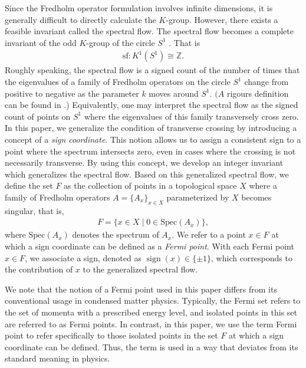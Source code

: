 \documentclass{amsart}
\theoremstyle{definition}
\theoremstyle{remark}
\begin{document}
Since the Fredholm operator formulation involves infinite dimensions, it is generally difficult to directly calculate the $K$-group. However, there exists a feasible invariant called the spectral flow. The spectral flow becomes a complete invariant of the odd $K$-group of the circle $S^1$ \cite{Atiyah76}.
 That is
\begin{align*}
\text{sf}\colon K^1(S^1)\cong \mathbb{Z}.
\end{align*}
Roughly speaking, the spectral flow is a signed count of the number of times that the eigenvalues of a family of Fredholm operators on the circle $S^1$ change from positive to negative as the parameter $k$ moves around $S^1$. $(A$ rigours
 definition can be found in \cite{Phillips}.) Equivalently, one may interpret the spectral flow as the signed count of points on $S^1$ where the eigenvalues of this family transversely cross zero. In this paper, we generalize the condition of transverse crossing by introducing a concept of a \emph{sign coordinate}. This notion allows us to assign a consistent sign to a point where the spectrum intersects zero, even in cases where the crossing is not necessarily transverse. By using this concept, we develop an integer invariant which generalizes the spectral flow. Based on this generalized spectral flow, we define the set $F$ as the collection of points in a topological space $X$ where a family of Fredholm operators $A=\{A_x\}_{x \in X}$ parameterized by $X$ becomes singular, that is,
\begin{align*}
F = \{ x \in X \mid 0 \in \text{Spec}(A_x) \},
\end{align*}
where $\text{Spec}(A_x)$ denotes the spectrum of $A_x$. We refer to a point $x \in F$ at which a sign coordinate can be defined as a \emph{Fermi point}. With each Fermi point $x \in F$, we associate a sign, denoted as $\operatorname{sign}(x) \in \{\pm 1\}$, which corresponds to the contribution of $x$ to the generalized spectral flow.

We note that the notion of a Fermi point used in this paper differs from its conventional usage in condensed matter physics. Typically, the Fermi set refers to the set of momenta with a prescribed energy level, and isolated points in this set are referred to as Fermi points. In contrast, in this paper, we use the term Fermi point to refer specifically to those isolated points in the set $F$ at which a sign coordinate can be defined. Thus, the term is used in a way that deviates from its standard meaning in physics.


\end{document}
